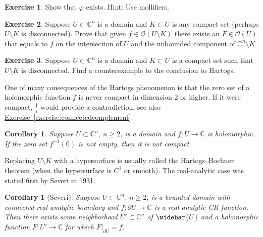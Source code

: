 \documentclass[12pt,openany]{book}
\newcommand{\C}{{\mathbb{C}}}
\newcommand{\sO}{{\mathscr{O}}}
\theoremstyle{plain}
\newtheorem{cor}[thm]{Corollary}
\theoremstyle{remark}
\theoremstyle{definition}
\newenvironment{exbox}{%
    \def\FrameCommand{\vrule width 1pt \relax\hspace{10pt}}%
    \MakeFramed{\advance\hsize-\width\FrameRestore}%
}{%
    \endMakeFramed
}
\theoremstyle{exercise}
\newtheorem{exercise}{Exercise}[section]
\theoremstyle{example}
\newcommand{\exerciseref}[1]{\hyperref[#1]{Exercise~\ref*{#1}}}
\begin{document}
\begin{exbox}
\begin{exercise}
Show that $\varphi$ exists.  Hint: Use mollifiers.
\end{exercise}

\begin{exercise}
Suppose $U \subset \C^n$ is a domain and
$K \subset U$ is any compact set (perhaps $U \setminus
K$ is disconnected).
Prove that given $f \in \sO(U \setminus K)$ there exists an $F \in \sO(U)$ that equals
to $f$ on the intersection of $U$ and the unbounded component
of $\C^n \setminus K$.
\end{exercise}

\begin{exercise}
Suppose $U \subset \C^n$ is a domain and
$K \subset U$ is a compact set such that $U \setminus K$ is disconnected.
Find a counterexample to the conclusion to Hartogs.
\end{exercise}
\end{exbox}

One of many consequences of the Hartogs phenomenon is
that
the zero set of a holomorphic function $f$ is never compact in
dimension 2 or higher.  If it
were compact, $\frac{1}{f}$ would provide a contradiction, see also
\exerciseref{exercise:connectedcomplement}.

\begin{cor}
Suppose $U \subset \C^n$, $n \geq 2$, is a domain and $f \colon U \to \C$ is
holomorphic.  If the zero set $f^{-1}(0)$ is not empty, then it is not compact.
\end{cor}

Replacing $U \setminus K$ with a hypersurface
is usually called the Hartogs--Bochner theorem (when the hypersurface is
$C^1$ or smooth).
The real-analytic case was stated first by Severi in 1931.

\begin{cor}[Severi]
Suppose $U \subset \C^n$, $n \geq 2$, is a bounded domain with connected real-analytic boundary and
$f \colon \partial U \to \C$ is a real-analytic CR function.  Then
there exists some neighborhood $U' \subset \C^n$ of $\widebar{U}$
and a holomorphic function $F \colon U' \to \C$ for which
$F|_{\partial U} = f$.
\end{cor}
\end{document}
